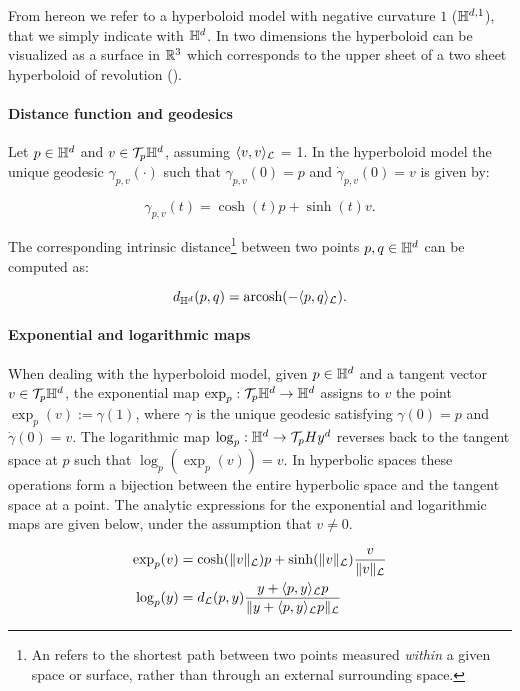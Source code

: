 From hereon we refer to a hyperboloid model with negative curvature $1$ ($\mathbb{H}^{d,1}$), that we simply indicate with $\mathbb{H}^d$. In two dimensions the hyperboloid can be visualized as a surface in $\mathbb{R}^3$ which corresponds to the upper sheet of a two sheet hyperboloid of revolution ().

\paragraph{Distance function and geodesics}
Let $p\in\mathbb{H}^d$ and $v\in \mathcal{T}_p\mathbb{H}^d$, assuming $\langle v,v\rangle_{\mathcal{L}} $ = 1. In the hyperboloid model the unique geodesic $\gamma_{p,v}(\cdot)$ such that $\gamma_{p,v}(0)=p$ and $\dot{\gamma}_{p,v}(0)=v$ is given by:

\begin{equation*}
    \gamma_{p,v}(t) = \cosh(t)p + \sinh(t)v.
\end{equation*}

The corresponding intrinsic distance\footnote{An  refers to the shortest path between two points measured \emph{within} a given space or surface, rather than through an external surrounding space.} between two points $p,q\in\mathbb{H}^d$ can be computed as:

\begin{equation}\label{eq:distance_hyperboloid}
    d_{\mathbb{H}^d}(p, q) = \text{arcosh}(-\langle p, q \rangle_{\mathcal{L}}).
\end{equation}

\paragraph{Exponential and logarithmic maps}
When dealing with the hyperboloid model, given $p \in \mathbb{H}^d$ and a tangent vector $v \in \mathcal{T}_p\mathbb{H}^d$, the exponential map $\exp_p: \mathcal{T}_p\mathbb{H}^d \to \mathbb{H}^d$ assigns to $v$ the point $\exp_p(v) := \gamma(1)$, where $\gamma$ is the unique geodesic satisfying $\gamma(0) = p$ and $\dot{\gamma}(0) = v$. The logarithmic map $\log_p: \mathbb{H}^d \to \mathcal{T}_pHy^d$ reverses back to the tangent space at $p$ such that $\log_p(\exp_p(v)) = v$. In hyperbolic spaces these operations form a bijection between the entire hyperbolic space and the tangent space at a point. The analytic expressions for the exponential and logarithmic maps are given below, under the assumption that $v\neq 0$.

\begin{align}
    \exp_p(v) &= \cosh(\|v\|_{\mathcal{L}})p + \sinh(\|v\|_{\mathcal{L}}) \frac{v}{\|v\|_{\mathcal{L}}} \label{eq:log_hyperboloid}\\
    \log_p(y) &= d_{\mathcal{L}}(p,y)\frac{y + \langle p,y \rangle_{\mathcal{L}}p}{\|y + \langle p,y \rangle_{\mathcal{L}}p\|_{\mathcal{L}}} \label{eq:exp_hyperboloid}
\end{align}

